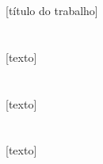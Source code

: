 \documentclass[a4paper, 11pt]{article}
\begin{document}






	\begin{center}
		\huge [título do trabalho]
	\end{center}

\section{}

[texto]


\section{}

[texto]


\section{}

[texto]



\pagebreak
\printbibliography[title={\underline{Referências:}}]
\end{document}
